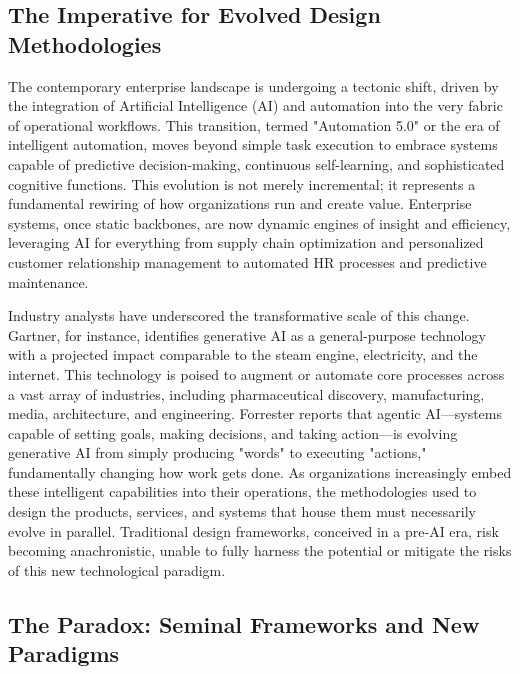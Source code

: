 \documentclass[
  12pt,
  a4paper,
  bibliography=totoc,
  numbers=noenddot
]{scrartcl}
\begin{document}
\subsection{The Imperative for Evolved
Design
Methodologies}\label{the-imperative-for-evolved-design-methodologies}

The contemporary enterprise landscape is undergoing a tectonic shift,
driven by the integration of Artificial Intelligence (AI) and automation
into the very fabric of operational workflows.\cite{cogleus2025rise} This
transition, termed "Automation 5.0" or the era of intelligent
automation, moves beyond simple task execution to embrace systems
capable of predictive decision-making, continuous self-learning, and
sophisticated cognitive functions.\cite{researchgate2025evolution} This evolution is
not merely incremental; it represents a fundamental rewiring of how
organizations run and create value.\cite{mckinsey2025state} Enterprise
systems, once static backbones, are now dynamic engines of insight and
efficiency, leveraging AI for everything from supply chain optimization
and personalized customer relationship management to automated HR
processes and predictive maintenance.\cite{cogleus2025rise}

Industry analysts have underscored the transformative scale of this
change. Gartner, for instance, identifies generative AI as a
general-purpose technology with a projected impact comparable to the
steam engine, electricity, and the internet.\cite{gartner2025generative} This
technology is poised to augment or automate core processes across a vast
array of industries, including pharmaceutical discovery, manufacturing,
media, architecture, and engineering.\cite{gartner2025generative} Forrester
reports that agentic AI---systems capable of setting goals, making
decisions, and taking action---is evolving generative AI from simply
producing "words" to executing "actions," fundamentally changing how
work gets done.\cite{nice2025forrester} As organizations increasingly embed
these intelligent capabilities into their operations, the methodologies
used to design the products, services, and systems that house them must
necessarily evolve in parallel. Traditional design frameworks, conceived
in a pre-AI era, risk becoming anachronistic, unable to fully harness
the potential or mitigate the risks of this new technological paradigm.

\subsection{The Paradox: Seminal
Frameworks and New
Paradigms}\label{the-paradox-seminal-frameworks-and-new-paradigms}
\end{document}
